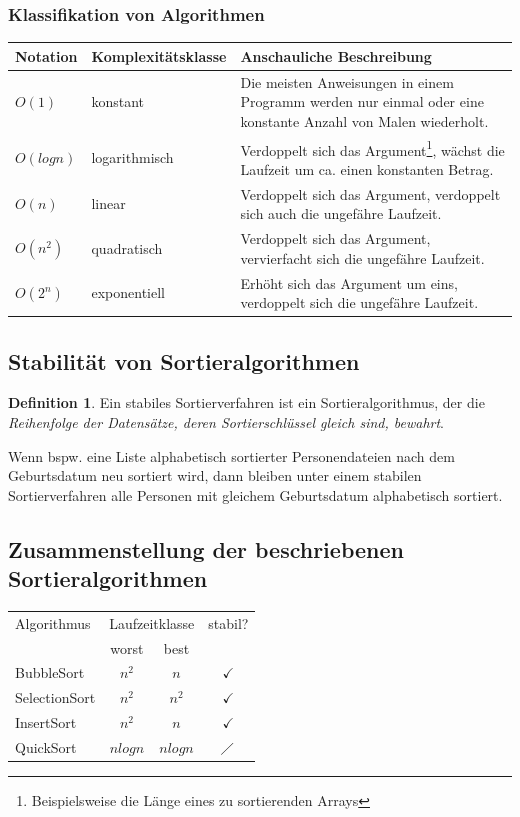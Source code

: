 \documentclass[a4paper,10pt,DIV9, BCOR12mm, oneside,openright,openbib]{scrreprt}
\theoremstyle{definition}
\newtheorem{mydef}{Definition}[section]
\theoremstyle{plain}
\begin{document}
\subsubsection{Klassifikation von Algorithmen}
\begin{center}
\begin{tabularx}{\columnwidth}{|l|l|X|} \hline 
\textbf{Notation} & \textbf{Komplexitätsklasse} & \textbf{Anschauliche Beschreibung}\\ \hline \hline 
$O(1)$ & konstant & Die meisten Anweisungen in einem Programm werden nur 
einmal oder eine konstante Anzahl von Malen wiederholt. \\ \hline 
$O(log n)$ & logarithmisch & Verdoppelt sich das Argument\footnote{Beispielsweise die Länge eines zu sortierenden Arrays}, wächst die Laufzeit um ca. einen konstanten Betrag.\\ \hline 
$O(n)$ & linear & Verdoppelt sich das Argument, verdoppelt sich auch die ungefähre Laufzeit.\\ \hline 
$O(n^2)$ & quadratisch & Verdoppelt sich das Argument, vervierfacht sich die ungefähre Laufzeit.\\ \hline 
$O(2^n)$ & exponentiell & Erhöht sich das Argument um eins, verdoppelt sich die ungefähre Laufzeit. \\ \hline 
\end{tabularx}
\end{center}

\subsection{Stabilität von Sortieralgorithmen}
\begin{mydef}
 Ein stabiles Sortierverfahren ist ein Sortieralgorithmus, der die \textit{Reihenfolge der Datensätze, deren Sortierschlüssel gleich sind, bewahrt}.
\end{mydef}
Wenn bspw. eine Liste alphabetisch sortierter Personendateien nach dem Geburtsdatum neu sortiert wird, dann bleiben unter einem stabilen Sortierverfahren alle Personen mit gleichem Geburtsdatum alphabetisch sortiert.

\subsection{Zusammenstellung der beschriebenen Sortieralgorithmen}
\begin{center}
\begin{tabular}{l|cc|c}
Algorithmus   & \multicolumn{2}{c|}{Laufzeitklasse} & stabil? \\ 
              & worst     & best     &  \\ \hline
BubbleSort    & $n^2$     & $n$      &  $\checkmark$ \\
SelectionSort & $n^2$     & $n^2$    &  $\checkmark$ \\
InsertSort    & $n^2$     & $n$      &  $\checkmark$ \\
QuickSort     & $n log n$ & $n log n$ & $\diagup$      
\end{tabular}
\end{center}
\end{document}
